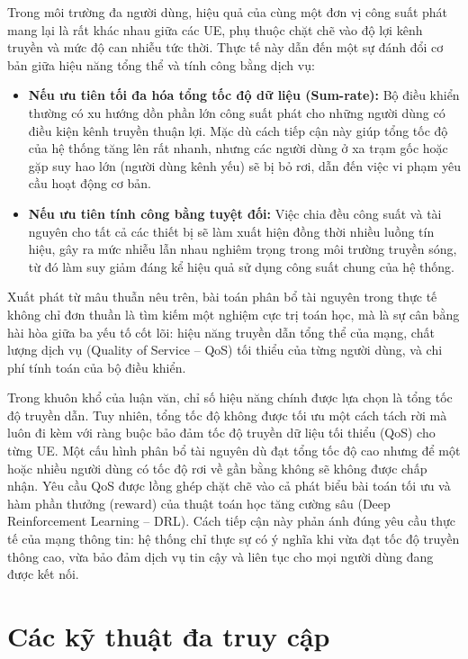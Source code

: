 Trong môi trường đa người dùng, hiệu quả của cùng một đơn vị công suất phát mang lại là rất khác nhau
giữa các UE, phụ thuộc chặt chẽ vào độ lợi kênh truyền và mức độ can nhiễu tức thời. Thực tế này dẫn đến
một sự đánh đổi cơ bản giữa hiệu năng tổng thể và tính công bằng dịch vụ:
\begin{itemize}
\item \textbf{Nếu ưu tiên tối đa hóa tổng tốc độ dữ liệu (Sum-rate):} Bộ điều khiển thường có xu hướng
  dồn phần lớn công suất phát cho những người dùng có điều kiện kênh truyền thuận lợi. Mặc dù cách tiếp
  cận này giúp tổng tốc độ của hệ thống tăng lên rất nhanh, nhưng các người dùng ở xa trạm gốc hoặc gặp
  suy hao lớn (người dùng kênh yếu) sẽ bị bỏ rơi, dẫn đến việc vi phạm yêu cầu hoạt động cơ bản.
\item \textbf{Nếu ưu tiên tính công bằng tuyệt đối:} Việc chia đều công suất và tài nguyên cho tất cả các
  thiết bị sẽ làm xuất hiện đồng thời nhiều luồng tín hiệu, gây ra mức nhiễu lẫn nhau nghiêm trọng trong
  môi trường truyền sóng, từ đó làm suy giảm đáng kể hiệu quả sử dụng công suất chung của hệ thống.
\end{itemize}

Xuất phát từ mâu thuẫn nêu trên, bài toán phân bổ tài nguyên trong thực tế không chỉ đơn thuần là tìm
kiếm một nghiệm cực trị toán học, mà là sự cân bằng hài hòa giữa ba yếu tố cốt lõi: hiệu năng truyền dẫn
tổng thể của mạng, chất lượng dịch vụ (Quality of Service -- QoS) tối thiểu của từng người dùng, và chi
phí tính toán của bộ điều khiển.

Trong khuôn khổ của luận văn, chỉ số hiệu năng chính được lựa chọn là tổng tốc độ truyền dẫn. Tuy nhiên,
tổng tốc độ không được tối ưu một cách tách rời mà luôn đi kèm với ràng buộc bảo đảm tốc độ truyền dữ
liệu tối thiểu (QoS) cho từng UE. Một cấu hình phân bổ tài nguyên dù đạt tổng tốc độ cao nhưng để một
hoặc nhiều người dùng có tốc độ rơi về gần bằng không sẽ không được chấp nhận. Yêu cầu QoS được lồng ghép
chặt chẽ vào cả phát biểu bài toán tối ưu và hàm phần thưởng (reward) của thuật toán học tăng cường sâu
(Deep Reinforcement Learning -- DRL). Cách tiếp cận này phản ánh đúng yêu cầu thực tế của mạng thông tin:
hệ thống chỉ thực sự có ý nghĩa khi vừa đạt tốc độ truyền thông cao, vừa bảo đảm dịch vụ tin cậy và liên
tục cho mọi người dùng đang được kết nối.

\section{Các kỹ thuật đa truy cập}
\label{sec:da-truy-cap}

